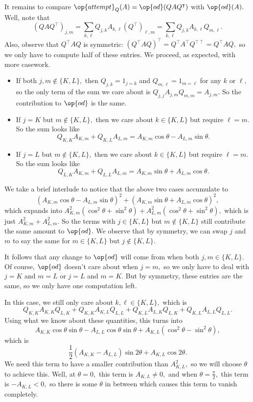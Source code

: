 It remains to compare $\op{attempt}_Q(A)=\op{od}(QAQ^\intercal)$ with $\op{od}(A).$ Well, note that
\[\left(QAQ^\intercal\right)_{j,m}=\sum_{k,\ell}Q_{j,k}A_{k,\ell}\left(Q^\intercal\right)_{\ell,m}=\sum_{k,\ell}Q_{j,k}A_{k,\ell}Q_{m,\ell}.\]
Also, observe that $Q^\intercal AQ$ is symmetric: $\left(Q^\intercal AQ\right)^\intercal=Q^\intercal A^\intercal Q^{\intercal\intercal}=Q^\intercal AQ,$ so we only have to compute half of these entries. We proceed, as expected, with more casework.
\begin{itemize}
    \item If both $j,m\not\in\{K,L\},$ then $Q_{j,k}=1_{j=k}$ and $Q_{m,\ell}=1_{m=\ell}$ for any $k$ or $\ell,$ so the only term of the sum we care about is $Q_{j,j}A_{j,m}Q_{m,m}=A_{j,m}.$ So the contribution to $\op{od}$ is the same.
    \item If $j=K$ but $m\not\in\{K,L\},$ then we care about $k\in\{K,L\}$ but require $\ell=m.$ So the sum looks like
    \[Q_{K,K}A_{K,m}+Q_{K,L}A_{L,m}=A_{K,m}\cos\theta-A_{L,m}\sin\theta.\]
    \item If $j=L$ but $m\not\in\{K,L\},$ then we care about $k\in\{K,L\}$ but require $\ell=m.$ So the sum looks like
    \[Q_{L,K}A_{K,m}+Q_{L,L}A_{L,m}=A_{K,m}\sin\theta+A_{L,m}\cos\theta.\]
\end{itemize}
We take a brief interlude to notice that the above two cases accumulate to
\[(A_{K,m}\cos\theta-A_{L,m}\sin\theta)^2+(A_{K,m}\sin\theta+A_{L,m}\cos\theta)^2,\]
which expands into $A_{K,m}^2\left(\cos^2\theta+\sin^2\theta\right)+A_{L,m}^2\left(\cos^2\theta+\sin^2\theta\right),$ which is just $A_{K,m}^2+A_{L,m}^2.$ So the terms with $j\in\{K,L\}$ but $m\not\in\{K,L\}$ still contribute the same amount to $\op{od}.$ We observe that by symmetry, we can swap $j$ and $m$ to say the same for $m\in\{K,L\}$ but $j\not\in\{K,L\}.$

It follows that any change to $\op{od}$ will come from when both $j,m\in\{K,L\}.$ Of course, $\op{od}$ doesn't care about when $j=m,$ so we only have to deal with $j=K$ and $m=L$ or $j=L$ and $m=K.$ But by symmetry, these entries are the same, so we only have one computation left.

In this case, we still only care about $k,\ell\in\{K,L\},$ which is
\[Q_{K,K}A_{K,K}Q_{L,K}+Q_{K,K}A_{K,L}Q_{L,L}+Q_{K,L}A_{L,K}Q_{L,K}+Q_{K,L}A_{L,L}Q_{L,L}.\]
Using what we know about these quantities, this turns into
\[A_{K,K}\cos\theta\sin\theta-A_{L,L}\cos\theta\sin\theta+A_{K,L}\left(\cos^2\theta-\sin^2\theta\right),\]
which is
\[\frac12(A_{K,K}-A_{L,L})\sin2\theta+A_{K,L}\cos2\theta.\]
We need this term to have a smaller contribution than $A_{K,L}^2,$ so we will choose $\theta$ to achieve this. Well, at $\theta=0,$ this term is $A_{K,L}\ne0,$ and when $\theta=\frac\pi2,$ this term is $-A_{K,L}<0,$ so there is some $\theta$ in between which causes this term to vanish completely.

